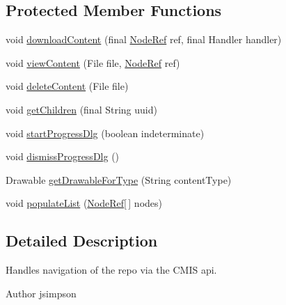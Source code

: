 \subsection*{Protected Member Functions}
\begin{DoxyCompactItemize}
\item 
void \hyperlink{classcom_1_1zia_1_1freshdocs_1_1widget_1_1adapter_1_1_c_m_i_s_adapter_a95df396da5cbcceb5c04c4027487f141}{download\-Content} (final \hyperlink{classcom_1_1zia_1_1freshdocs_1_1model_1_1_node_ref}{Node\-Ref} ref, final Handler handler)
\item 
void \hyperlink{classcom_1_1zia_1_1freshdocs_1_1widget_1_1adapter_1_1_c_m_i_s_adapter_a9d348415418e441b9341eba6f4e5498e}{view\-Content} (File file, \hyperlink{classcom_1_1zia_1_1freshdocs_1_1model_1_1_node_ref}{Node\-Ref} ref)
\item 
void \hyperlink{classcom_1_1zia_1_1freshdocs_1_1widget_1_1adapter_1_1_c_m_i_s_adapter_a817be93ed6b37650c287658290979de2}{delete\-Content} (File file)
\item 
void \hyperlink{classcom_1_1zia_1_1freshdocs_1_1widget_1_1adapter_1_1_c_m_i_s_adapter_a780935507c888918883e46c32d6f42a1}{get\-Children} (final String uuid)
\item 
void \hyperlink{classcom_1_1zia_1_1freshdocs_1_1widget_1_1adapter_1_1_c_m_i_s_adapter_abb10563fcea7087aeb15104e78a0c874}{start\-Progress\-Dlg} (boolean indeterminate)
\item 
void \hyperlink{classcom_1_1zia_1_1freshdocs_1_1widget_1_1adapter_1_1_c_m_i_s_adapter_ad45a8b29e33cbe993e1cab2a8308f847}{dismiss\-Progress\-Dlg} ()
\item 
Drawable \hyperlink{classcom_1_1zia_1_1freshdocs_1_1widget_1_1adapter_1_1_c_m_i_s_adapter_a85a41867c4d101b0648f2b3075ac5a70}{get\-Drawable\-For\-Type} (String content\-Type)
\item 
void \hyperlink{classcom_1_1zia_1_1freshdocs_1_1widget_1_1adapter_1_1_c_m_i_s_adapter_a62997974b9e8786d516ed6a081bde5cf}{populate\-List} (\hyperlink{classcom_1_1zia_1_1freshdocs_1_1model_1_1_node_ref}{Node\-Ref}\mbox{[}$\,$\mbox{]} nodes)
\end{DoxyCompactItemize}


\subsection{Detailed Description}
Handles navigation of the repo via the C\-M\-I\-S api.

\begin{DoxyAuthor}{Author}
jsimpson 
\end{DoxyAuthor}


